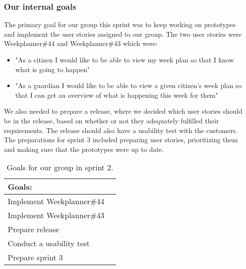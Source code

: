 \subsubsection{Our internal goals}
The primary goal for our group this sprint was to keep working on prototypes and implement the user stories assigned to our group.
The two user stories were Weekplanner\#44 and Weekplanner\#43 which were:
\begin{itemize}
 \item "As a citizen I would like to be able to view my week plan so that I know what is going to happen" 
 \item "As a guardian I would like to be able to view a given citizen's week plan so that I can get an overview of what is happening this week for them"
\end{itemize}
We also needed to prepare a release, where we decided which user stories should be in the release, based on whether or not they adequately fulfilled their requirements.
The release should also have a usability test with the customers.
The preparations for sprint 3 included preparing user stories, prioritizing them and making sure that the prototypes were up to date.
\begin{table}[H]
    \centering
    \begin{tabular}{|l|l|}
    \hline
    Goals:                                   \\ \hline
    Implement Weekplanner\#44               \\ \hline
    Implement Weekplanner\#43               \\ \hline
    Prepare release                          \\ \hline
    Conduct a usability test                   \\ \hline
    Prepare sprint 3                         \\ \hline
    \end{tabular}
    \caption{Goals for our group in sprint 2.}
    \label{PO-goal-sprint-2}
\end{table}
